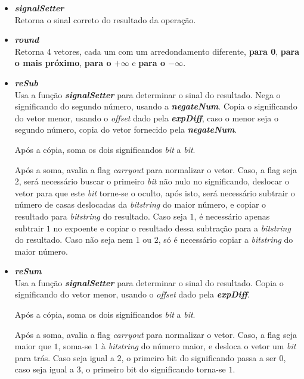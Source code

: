 \documentclass{article}
\begin{document}
\begin{itemize}
    \item \textbf{\textit{signalSetter}}
        \\ Retorna o sinal correto do resultado da operação.
    
    \item \textbf{\textit{round}}
        \\ Retorna 4 vetores, cada um com um arredondamento diferente,
        \textbf{para 0}, \textbf{para o mais próximo}, \textbf{para o $+
        \infty$} e \textbf{para o $- \infty$}.

    \item \textbf{\textit{reSub}}
        \\ Usa a função \textit{\textbf{signalSetter}} para determinar o sinal
        do resultado. Nega o significando do segundo número, usando a 
        \textbf{\textit{negateNum}}. Copia o significando do vetor menor, usando 
        o \textit{offset} dado pela \textit{\textbf{expDiff}}, caso o menor seja 
        o segundo número, copia do vetor fornecido pela \textit{\textbf{negateNum}}.

        Após a cópia, soma os dois significandos \textit{bit} a \textit{bit}.
        
        Após a soma, avalia a flag \textit{carryout} para normalizar o vetor. Caso, a flag 
        seja $2$, será necessário buscar o primeiro \textit{bit} não nulo no
        significando, deslocar o vetor para que este \textit{bit} torne-se o
        oculto, após isto, será necessário subtrair o número de casas deslocadas
        da \textit{bitstring} do maior número, e copiar o resultado para
        \textit{bitstring} do resultado. Caso seja $1$, é necessário apenas subtrair $1$
        no expoente e copiar o resultado dessa subtração para a \textit{bitstring} 
        do resultado. Caso não seja nem $1$ ou $2$, só é necessário copiar a 
        \textit{bitstring} do maior número.
    
    \item \textbf{\textit{reSum}}
        \\ Usa a função \textit{\textbf{signalSetter}} para determinar o sinal
        do resultado. Copia o significando do vetor menor, usando o \textit{offset} 
        dado pela \textit{\textbf{expDiff}}.

        Após a cópia, soma os dois significandos \textit{bit} a \textit{bit}.

        Após a soma, avalia a flag \textit{carryout} para normalizar o vetor.
        Caso, a flag seja maior que $1$, soma-se $1$ à \textit{bitstring} do
        número maior, e desloca o vetor um \textit{bit} para trás. Caso seja 
        igual a $2$, o primeiro bit do significando passa a ser $0$, caso seja 
        igual a $3$, o primeiro bit do significando torna-se $1$.

\end{itemize}
\end{document}
